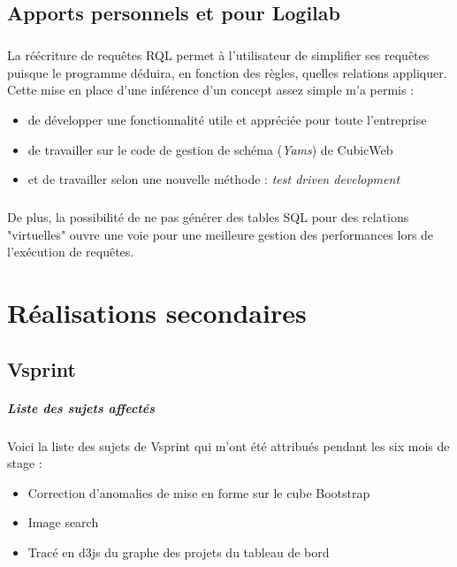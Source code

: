 \documentclass {report}
\begin{document}
\section{Apports personnels et pour Logilab}
\paragraph{}
La réécriture de requêtes RQL permet à l'utilisateur de simplifier ses requêtes puisque le programme déduira, en fonction des règles, quelles relations appliquer. Cette mise en place d'une inférence d'un concept assez simple m'a permis : 
    \begin{itemize}
    \item de développer une fonctionnalité utile et appréciée pour toute l'entreprise
    \item de travailler sur le code de gestion de schéma (\textit{Yams}) de CubicWeb
    \item et de travailler selon une nouvelle méthode : \textit{test driven development}
    \end{itemize}
\paragraph{}
De plus, la possibilité de ne pas générer des tables SQL pour des relations "virtuelles" ouvre une voie pour une meilleure gestion des performances lors de l'exécution de requêtes.




\chapter{Réalisations secondaires}
\section{Vsprint}
\paragraph{Liste des sujets affectés}
 Voici la liste des sujets de Vsprint qui m'ont été attribués pendant les six mois de stage : 
\begin{itemize}
\item Correction d'anomalies de mise en forme sur le cube Bootstrap
\item Image search
\item Tracé en d3js du graphe des projets du tableau de bord
\end{itemize}
\end{document}
